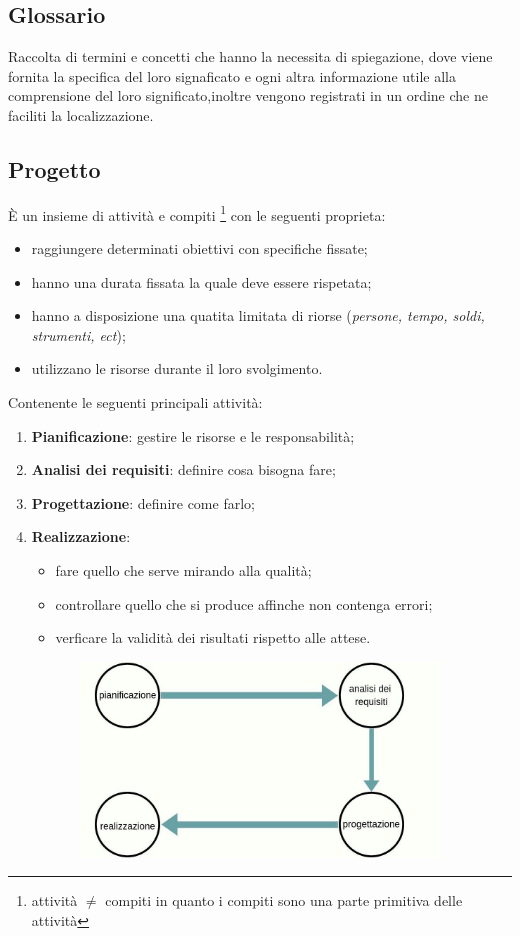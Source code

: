 \documentclass{article}
\begin{document}
    \subsection{Glossario}
        Raccolta di termini e concetti che hanno la necessita di spiegazione, dove viene fornita la specifica del loro signaficato e ogni altra informazione utile alla comprensione del loro significato,inoltre vengono registrati in un ordine che ne faciliti la localizzazione.
    \subsection{Progetto}
        È un insieme di attività e compiti \footnote{attività $\ne$ compiti in quanto i compiti sono una parte primitiva delle attività} con le seguenti proprieta:
        \begin{itemize}
            \item raggiungere determinati obiettivi con specifiche fissate;
            \item hanno una durata fissata la quale deve essere rispetata;
            \item hanno a disposizione una quatita limitata di riorse (\textit{persone, tempo, soldi, strumenti, ect});
            \item utilizzano le risorse durante il loro svolgimento.  
            \end{itemize}
        Contenente le seguenti principali attività:
        \begin{enumerate}[I]
            \item \textbf{Pianificazione}: gestire le risorse e le responsabilità;
            \item \textbf{Analisi dei requisiti}: definire cosa bisogna fare;
            \item \textbf{Progettazione}: definire come farlo;
            \item \textbf{Realizzazione}:
            \begin{itemize}
                \item fare quello che serve mirando alla qualità; 
                \item controllare quello che si produce affinche non contenga errori;
                \item verficare la validità dei risultati rispetto alle attese.
                \end{itemize}
            \end{enumerate}
        \begin{figure}[!h]      
            \centering  
            \includegraphics[height=14em,width=15cm]{img/attivita.jpg}
            \end{figure}
            
\end{document}
